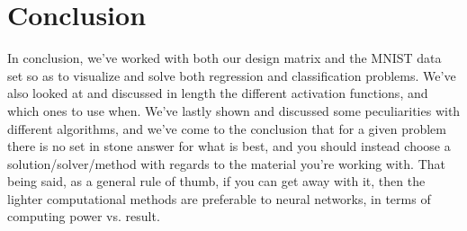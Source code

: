 \documentclass{article}
\begin{document}
\section{Conclusion}
In conclusion, we've worked with both our design matrix and the MNIST data set so as to visualize and solve both regression and classification problems. We've also looked at and discussed in length the different activation functions, and which ones to use when. \newline
We've lastly shown and discussed some peculiarities with different algorithms, and we've come to the conclusion that for a given problem there is no set in stone answer for what is best, and you should instead choose a solution/solver/method with regards to the material you're working with. That being said, as a general rule of thumb, if you can get away with it, then the lighter computational methods are preferable to neural networks, in terms of computing power vs. result.


\newpage
\end{document}
